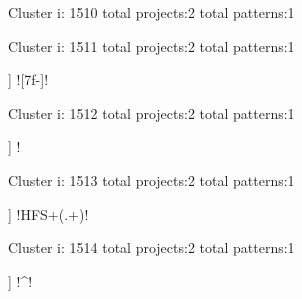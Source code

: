 Cluster i: 1510
total projects:2
total patterns:1
\begin{multicols}{1}
\end{multicols}







Cluster i: 1511
total projects:2
total patterns:1
\begin{multicols}{1}
\begin{description}[noitemsep,topsep=0pt]
\item [[2] ] \cverb![\x7f-\xff]!
\end{description}
\end{multicols}







Cluster i: 1512
total projects:2
total patterns:1
\begin{multicols}{1}
\begin{description}[noitemsep,topsep=0pt]
\item [[2] ] \cverb!%
\end{description}
\end{multicols}







Cluster i: 1513
total projects:2
total patterns:1
\begin{multicols}{1}
\begin{description}[noitemsep,topsep=0pt]
\item [[2] ] \cverb!HFS\s+(.+)!
\end{description}
\end{multicols}







Cluster i: 1514
total projects:2
total patterns:1
\begin{multicols}{1}
\begin{description}[noitemsep,topsep=0pt]
\item [[2] ] \cverb!^\s*\/\/!
\end{description}
\end{multicols}







